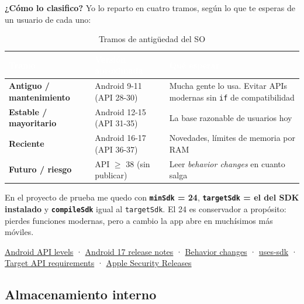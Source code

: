 \documentclass[11pt,a4paper]{article}
\newcommand{\code}[1]{\texttt{\color{primary}#1}}
\newcommand{\campo}[1]{\textbf{\color{primary}#1}}
\begin{document}
	\campo{¿Cómo lo clasifico?}
	Yo lo reparto en cuatro tramos, según lo que te esperas de un usuario de cada uno:
	
	\begin{table}[htbp]
		\centering
		\small
		\begin{tabularx}{\textwidth}{@{}>{\RaggedRight\arraybackslash}p{3.5cm} >{\RaggedRight\arraybackslash}p{4cm} >{\RaggedRight\arraybackslash}X@{}}
			\toprule
			\rowcolor{primary}
			\textcolor{white}{\sffamily\bfseries Tramo} & \textcolor{white}{\sffamily\bfseries Versión aproximada} & \textcolor{white}{\sffamily\bfseries Qué esperar} \\
			\midrule
			\textbf{Antiguo / mantenimiento} & Android 9-11 (API 28-30) & Mucha gente lo usa. Evitar APIs modernas sin \code{if} de compatibilidad \\
			\rowcolor{soft}
			\textbf{Estable / mayoritario} & Android 12-15 (API 31-35) & La base razonable de usuarios hoy \\
			\textbf{Reciente} & Android 16-17 (API 36-37) & Novedades, límites de memoria por RAM \\
			\rowcolor{soft}
			\textbf{Futuro / riesgo} & API $\geq$ 38 (sin publicar) & Leer \emph{behavior changes} en cuanto salga \\
			\bottomrule
		\end{tabularx}
		\caption{Tramos de antigüedad del SO}
	\end{table}
	
	En el proyecto de prueba me quedo con \textbf{\code{minSdk} = 24}, \textbf{\code{targetSdk} = el del SDK instalado} y \textbf{\code{compileSdk}} igual al \code{targetSdk}. El 24 es conservador a propósito: pierdes funciones modernas, pero a cambio la app abre en muchísimos más móviles.
	
	\begin{fuentesbox}
		\href{https://developer.android.com/tools/releases/platforms}{Android API levels} ·
		\href{https://developer.android.com/about/versions/17/release-notes}{Android 17 release notes} ·
		\href{https://developer.android.com/about/versions/17/behavior-changes-all}{Behavior changes} ·
		\href{https://developer.android.com/guide/topics/manifest/uses-sdk-element}{uses-sdk} ·
		\href{https://support.google.com/googleplay/android-developer/answer/11926878}{Target API requirements} ·
		\href{https://support.apple.com/en-us/148282}{Apple Security Releases}
	\end{fuentesbox}
	
	\subsection{Almacenamiento interno}
	
\end{document}
